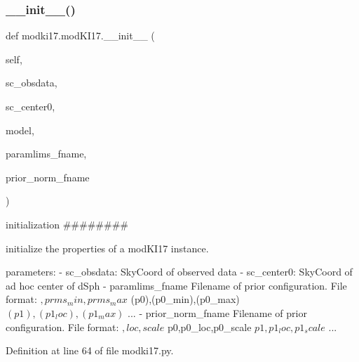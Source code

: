 \subsubsection{\texorpdfstring{\+\_\+\+\_\+init\+\_\+\+\_\+()}{\_\_init\_\_()}}
{\footnotesize\ttfamily def modki17.\+mod\+K\+I17.\+\_\+\+\_\+init\+\_\+\+\_\+ (\begin{DoxyParamCaption}\item[{}]{self,  }\item[{}]{sc\+\_\+obsdata,  }\item[{}]{sc\+\_\+center0,  }\item[{}]{model,  }\item[{}]{paramlims\+\_\+fname,  }\item[{}]{prior\+\_\+norm\+\_\+fname }\end{DoxyParamCaption})}



initialization \#\#\#\#\#\#\#\# 

\begin{DoxyVerb}initialize the properties of a modKI17 instance.

parameters:
    - sc_obsdata:
SkyCoord of observed data
    - sc_center0: 
SkyCoord of ad hoc center of dSph
    - paramlims_fname
Filename of prior configuration. File format: 
    $     ,prms_min,prms_max
    $ (p0),(p0_min),(p0_max)
    $ (p1),(p1_loc),(p1_max)
    $ ...
    - prior_norm_fname
Filename of prior configuration. File format: 
    $   ,loc   ,scale
    $ p0,p0_loc,p0_scale
    $ p1,p1_loc,p1_scale
    $ ...
\end{DoxyVerb}
 

Definition at line 64 of file modki17.\+py.


